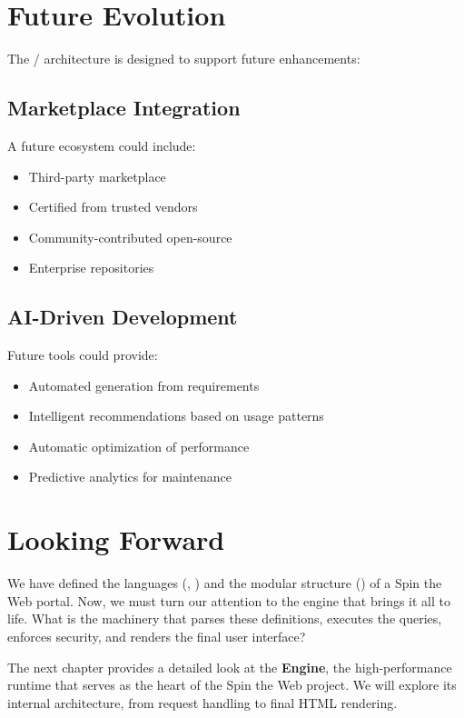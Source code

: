 \section{Future Evolution}
\label{sec:future-evolution}

The \webbase{}/\webbaselet{} architecture is designed to support future enhancements:

\subsection{Marketplace Integration}

A future ecosystem could include:
\begin{itemize}
\item Third-party \webbaselet{} marketplace
\item Certified  from trusted vendors
\item Community-contributed open-source 
\item Enterprise \webbaselet{} repositories
\end{itemize}

\subsection{AI-Driven Development}

Future tools could provide:
\begin{itemize}
\item Automated \webbaselet{} generation from requirements
\item Intelligent \webbaselet{} recommendations based on usage patterns
\item Automatic optimization of \webbaselet{} performance
\item Predictive analytics for \webbaselet{} maintenance
\end{itemize}

\section{Looking Forward}
\label{sec:webbaselets-forward}

We have defined the languages (\wbdl{}, \wbpl{}) and the modular structure () of a Spin the Web portal. Now, we must turn our attention to the engine that brings it all to life. What is the machinery that parses these definitions, executes the queries, enforces security, and renders the final user interface?

The next chapter provides a detailed look at the \textbf{\webspinner{} Engine}, the high-performance runtime that serves as the heart of the Spin the Web project. We will explore its internal architecture, from request handling to final HTML rendering.
